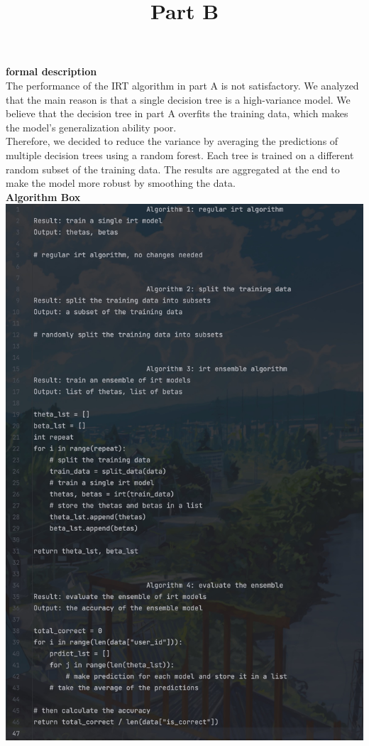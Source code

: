 \documentclass{article}
\title{Part B}
\date{\vspace{-10.0ex}}
\begin{document}
\maketitle
\thispagestyle{fancy}

\begin{enumerate}
    \textbf{formal description} \vspace{10}\\
    The performance of the IRT algorithm in part A is not satisfactory. We analyzed that the main reason is that a single decision tree is a high-variance model. We believe that the decision tree in part A overfits the training data, which makes the model's generalization ability poor.\vspace{10}\\
    Therefore, we decided to reduce the variance by averaging the predictions of multiple decision trees using a random forest. Each tree is trained on a different random subset of the training data. The results are aggregated at the end to make the model more robust by smoothing the data.\vspace{15}\\
    \textbf{Algorithm Box} \vspace{10}\\
    \includegraphics[width=0.7\linewidth]{6051723192250_.pic.jpg} \vspace{10}\\

\end{enumerate}
\end{document}
